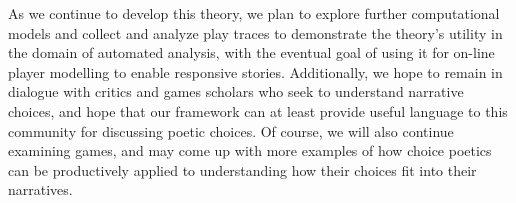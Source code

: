 \documentclass[arts,article,submit,moreauthors,pdftex,10pt,a4paper]{Definitions/mdpi}
\begin{document}
As we continue to develop this theory, we plan to explore further computational models and collect and analyze play traces to demonstrate the theory's utility in the domain of automated analysis, with the eventual goal of using it for on-line player modelling to enable responsive stories.
%
Additionally, we hope to remain in dialogue with critics and games scholars who seek to understand narrative choices, and hope that our framework can at least provide useful language to this community for discussing poetic choices.
%
Of course, we will also continue examining games, and may come up with more examples of how choice poetics can be productively applied to understanding how their choices fit into their narratives.

\vspace{6pt} 






\end{document}
